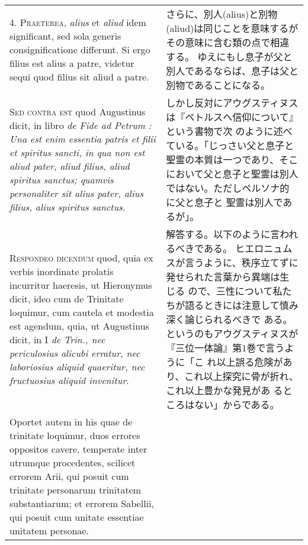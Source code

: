 \documentclass[10pt]{jsarticle} %
\begin{document}
\begin{longtable}{p{21em}p{21em}}
\\



4. {\scshape Praeterea}, {\itshape alius} et {\itshape aliud} idem significant, sed sola generis
consignificatione differunt. Si ergo filius est alius a patre, videtur
sequi quod filius sit aliud a patre.


&

さらに、別人(alius)と別物(aliud)は同じことを意味するがその意味に含む類の点で相違する。
 ゆえにもし息子が父と別人であるならば、息子は父と別物であることになる。

\\



{\scshape Sed contra est} quod Augustinus dicit, in libro {\itshape de
 Fide ad Petrum : Una
est enim essentia patris et filii et spiritus sancti, in qua non est
aliud pater, aliud filius, aliud spiritus sanctus; quamvis
personaliter sit alius pater, alius filius, alius spiritus sanctus}.


&

しかし反対にアウグスティヌスは『ペトルスへ信仰について』という書物で次
 のように述べている。「じっさい父と息子と聖霊の本質は一つであり、そこ
 において父と息子と聖霊は別人ではない。ただしペルソナ的に父と息子と
 聖霊は別人であるが」。

\\



{\scshape Respondeo dicendum} quod, quia ex verbis inordinate prolatis incurritur
haeresis, ut Hieronymus dicit, ideo cum de Trinitate loquimur, cum
cautela et modestia est agendum, quia, ut Augustinus dicit, in I {\itshape de
Trin., nec periculosius alicubi erratur, nec laboriosius aliquid
quaeritur, nec fructuosius aliquid invenitur}. 

&

解答する。以下のように言われるべきである。
ヒエロニュムスが言うように、秩序立てずに発せられた言葉から異端は生じる
ので、三性について私たちが語るときには注意して慎み深く論じられるべきで
 ある。というのもアウグスティヌスが『三位一体論』第1巻で言うように「こ
 れ以上誤る危険があり、これ以上探究に骨が折れ、これ以上豊かな発見があ
 るところはない」からである。

\\



Oportet autem in his
quae de trinitate loquimur, duos errores oppositos cavere, temperate
inter utrumque procedentes, scilicet errorem Arii, qui posuit cum
trinitate personarum trinitatem substantiarum; et errorem Sabellii,
qui posuit cum unitate essentiae unitatem personae. 


\end{longtable}
\end{document}
